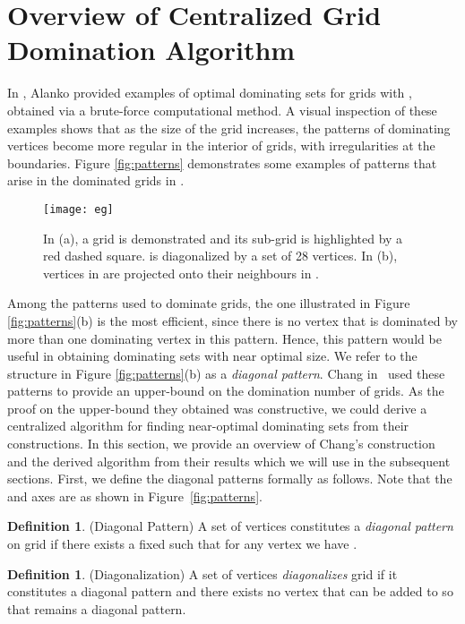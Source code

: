 \documentclass[letterpaper, 10pt, conference]{ieeeconf}
\theoremstyle{definition}
\newtheorem{definition}[theorem]{Definition}
\theoremstyle{remark}
\begin{document}
\section{Overview of Centralized Grid Domination Algorithm}
\label{sec:center-domin}
In \cite{ACIP'11}, Alanko  provided examples of optimal dominating sets for  grids with , obtained via a brute-force computational method. A visual inspection of these examples shows that as the size of the grid increases, the patterns of dominating vertices become more regular in the interior of grids, with irregularities at the boundaries. Figure \ref{fig:patterns} demonstrates some examples of patterns that arise in the dominated grids in \cite{ACIP'11}.

\begin{figure}[t]
\texttt{[image: eg]}
\caption{In (a), a  grid  is demonstrated and its  sub-grid  is highlighted by a red dashed square.  is diagonalized by a set  of 28 vertices. In (b), vertices in  are projected onto their neighbours in .}
\label{fig:eg}      
\end{figure}


Among the patterns used to dominate grids, the one illustrated in Figure \ref{fig:patterns}(b) is the most efficient, since there is no vertex that is dominated by more than one dominating vertex in this pattern. Hence, this pattern would be useful in obtaining dominating sets with near optimal size. We refer to the structure in Figure \ref{fig:patterns}(b) as a \emph{diagonal pattern}. Chang  in~\cite{TYC'92} used these patterns to provide an upper-bound on the domination number of grids. As the proof on the upper-bound they obtained was constructive, we could derive a centralized algorithm for finding near-optimal dominating sets from their constructions. 
In this section, we provide an overview of Chang's construction and the derived algorithm from their results which we will use in the subsequent sections. First, we define the diagonal patterns formally as follows.  
Note that the  and  axes are as shown in Figure~\ref{fig:patterns}.


\begin{definition}(Diagonal Pattern)
\label{def:diag-patt}
A set of vertices  constitutes a \emph{diagonal pattern} on grid  if there exists a fixed  such that for any vertex  we have .
\end{definition}


\begin{definition}(Diagonalization)
\label{def:diagonalization}
A set of vertices  \emph{diagonalizes} grid  if it constitutes a diagonal pattern and there exists no vertex  that can be added to  so that  remains a diagonal pattern.
\end{definition}
\end{document}
